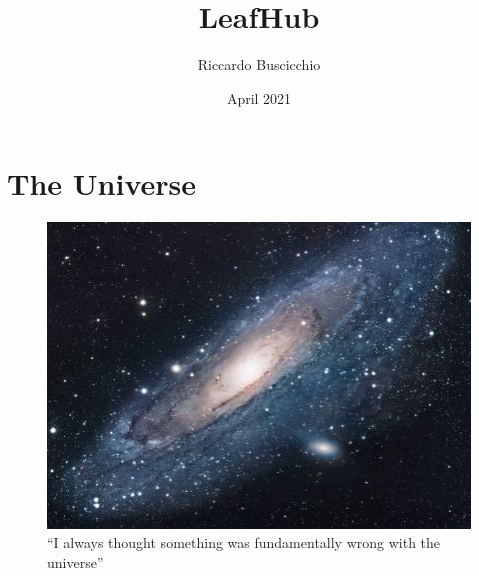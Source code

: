 \documentclass{article}
\title{LeafHub}
\author{Riccardo Buscicchio}
\date{April 2021}
\begin{document}
\maketitle

\section{The Universe}

\begin{figure}[h!]
\centering
\includegraphics[scale=1.7]{universe}
\caption{``I always thought something was fundamentally wrong with the universe'' \citep{adams1995hitchhiker}
}
\label{fig:universe}
\end{figure}




\end{document}
